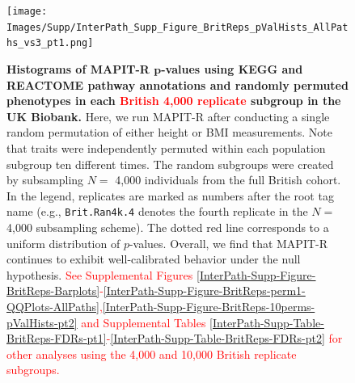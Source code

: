 \documentclass[10pt]{article}
\begin{document}

\begin{figure}[htbp]
\centering
\texttt{[image: Images/Supp/InterPath\_Supp\_Figure\_BritReps\_pValHists\_AllPaths\_vs3\_pt1.png]}
\caption{\textbf{Histograms of MAPIT-R $\bm{p}$-values using KEGG and REACTOME pathway annotations and randomly permuted phenotypes in each \textcolor{red}{British 4,000 replicate} subgroup in the UK Biobank.} Here, we run MAPIT-R after conducting a single random permutation of either height or BMI measurements. Note that traits were independently permuted within each population subgroup ten different times. The random subgroups were created by subsampling $N =$ 4,000 individuals from the full British cohort. In the legend, replicates are marked as numbers after the root tag name (e.g., \texttt{Brit.Ran4k.4} denotes the fourth replicate in the $N =$ 4,000 subsampling scheme). The dotted red line corresponds to a uniform distribution of $p$-values. Overall, we find that MAPIT-R continues to exhibit well-calibrated behavior under the null hypothesis.
\textcolor{red}{See Supplemental Figures \ref{InterPath-Supp-Figure-BritReps-Barplots}-\ref{InterPath-Supp-Figure-BritReps-perm1-QQPlots-AllPaths},\ref{InterPath-Supp-Figure-BritReps-10perms-pValHists-pt2} and Supplemental Tables \ref{InterPath-Supp-Table-BritReps-FDRs-pt1}-\ref{InterPath-Supp-Table-BritReps-FDRs-pt2} for other analyses using the 4,000 and 10,000 British replicate subgroups.}}
\label{InterPath-Supp-Figure-BritReps-10perms-pValHists-pt1}
\end{figure}
\clearpage

\end{document}
